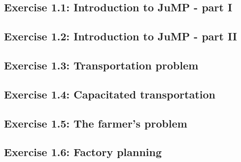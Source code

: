 \subsection*{Exercise 1.1: Introduction to JuMP - part I}


\subsection*{Exercise 1.2: Introduction to JuMP - part II}


\subsection*{Exercise 1.3: Transportation problem}


\subsection*{Exercise 1.4: Capacitated transportation}


\subsection*{Exercise 1.5: The farmer's problem}


\subsection*{Exercise 1.6: Factory planning}





